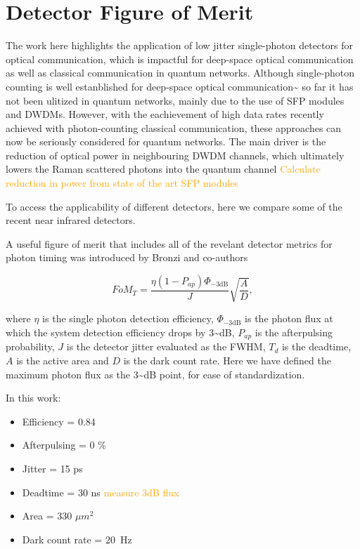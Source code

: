 \documentclass[11pt]{caltech_thesis} %
\begin{document}
\hypertarget{detector-figure-of-merit}{%
\section{Detector Figure of Merit}\label{detector-figure-of-merit}}

The work here highlights the application of low jitter single-photon
detectors for optical communication, which is impactful for deep-space
optical communication as well as classical communication in quantum
networks. Although single-photon counting is well estanblished for
deep-space optical
communication\textasciitilde{}\autocite{Srinivasan2023GroundReceiver} so
far it has not been ulitized in quantum networks, mainly due to the use
of SFP modules and DWDMs. However, with the eachievement of high data
rates recently achieved with photon-counting classical communication,
these approaches can now be seriously considered for quantum networks.
The main driver is the reduction of optical power in neighbouring DWDM
channels, which ultimately lowers the Raman scattered photons into the
quantum channel \autocite{EraerdsRaman} \textcolor{orange}{Calculate
reduction in power from state of the art SFP modules}

To access the applicability of different detectors, here we compare some
of the recent near infrared detectors.

A useful figure of merit that includes all of the revelant detector
metrics for photon timing was introduced by Bronzi and co-authors
\autocite{Bronzi2016}

$$FoM_T = \frac{\eta  (1 - P_{ap})\Phi_{-3 \text{dB}}}{J} \sqrt{\frac{A}{D}},$$

where $\eta$ is the single photon detection efficiency,
$\Phi_{-3 \text{dB}}$ is the photon flux at which the system detection
efficiency drops by 3\textasciitilde dB, $P_{ap}$ is the afterpulsing
probability, $J$ is the detector jitter evaluated as the FWHM, $T_d$ is
the deadtime, $A$ is the active area and $D$ is the dark count rate.
Here we have defined the maximum photon flux as the 3\textasciitilde dB
point, for ease of standardization.

In this work:

\begin{itemize}
\tightlist
\item
  Efficiency = 0.84
\item
  Afterpulsing = 0 \%
\item
  Jitter = 15 ps
\item
  Deadtime = 30 ns \textcolor{orange}{measure 3dB flux}
\item
  Area = 330 $\mu m^2$
\item
  Dark count rate = 20~Hz
\end{itemize}
\end{document}
